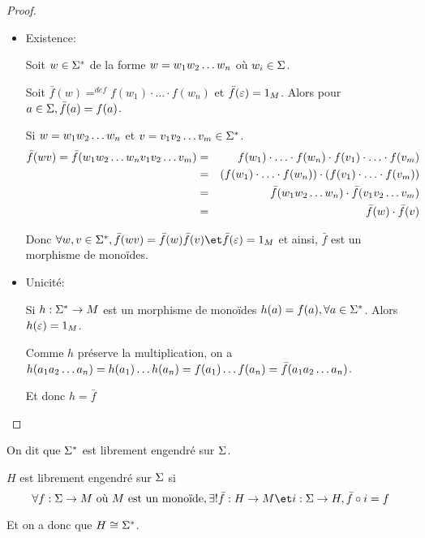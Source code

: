 \begin{proof}
	\begin{itemize}
		\item Existence:

		      Soit $w\in \Sigma^{*}$ de la forme $w = w_1 w_2 \ldots w_{n}$ où $w_i \in \Sigma$.

		      Soit $\bar f (w) =^{def} f(w_1) \cdot \ldots \cdot f(w_n)$ et $\bar f (\varepsilon) = 1_M$. Alors pour $a\in \Sigma, \bar f (a) = f (a)$.

		      Si $w = w_1 w_2 \ldots w_{n}$ et $v = v_1 v_2 \ldots v_{m} \in \Sigma^{*}$.
		      \begin{eqnarray*}
			      \bar f(wv) = \bar f(w_1 w_2 \ldots w_{n} v_1 v_2 \ldots v_{m}) &=& f(w_1) \cdot \ldots \cdot f(w_n) \cdot f(v_1) \cdot \ldots \cdot f(v_m) \\
			      &=& \left( f(w_1) \cdot \ldots \cdot f(w_n)\right)\cdot\left(f(v_1) \cdot \ldots \cdot f(v_m) \right)\\
			      &=& \bar f(w_1 w_2 \ldots w_{n}) \cdot \bar f (v_1 v_2 \ldots v_{m}) \\
			      &=& \bar f(w) \cdot \bar f (v)
		      \end{eqnarray*}

		      Donc $\forall w, v \in \mots, \bar f (wv) = \bar f (w)\bar f(v) \et \bar f (\motvide) = 1_M$ et ainsi, $\bar f$ est un morphisme de monoïdes.


		\item Unicité:

		      Si $h : \Sigma^{*} \to M$ est un morphisme de monoïdes \tq $h(a) = f(a), \forall a \in \Sigma^{*}$. Alors $h(\varepsilon) = 1_M$.

		      Comme $h$ préserve la multiplication, on a
		      $h (a_1 a_2 \ldots a_{n}) = h(a_1) \ldots h(a_n) = f(a_1) \ldots f(a_n) = \bar f (a_1 a_2 \ldots a_{n})$.

		      Et donc $h = \bar f$
	\end{itemize}
\end{proof}

On dit que $\Sigma^{*}$ est librement engendré sur $\Sigma$.

\begin{definition}
	$H$ est librement engendré sur $\Sigma$ si
	$$\forall f : \alphabet \to M \text{ où } M  \text { est un monoïde}, \exists ! \bar f : H \to M \et i : \alphabet \to H, \bar f \circ i   = f $$


    Et on a donc que $ H \cong \Sigma^{*}$.
\end{definition}

